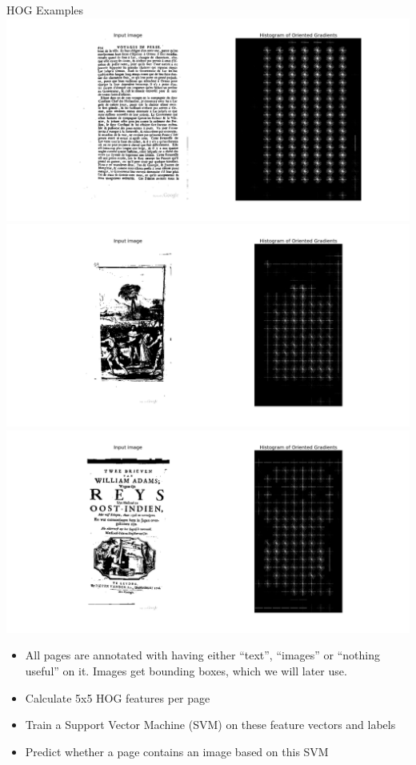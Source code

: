 \begin{frame}[allowframebreaks]{HOG Examples}
	\includegraphics[trim=200px 0px 100px 0px, clip=true, width=.8\paperwidth]{resources/text1}\\
\framebreak
	\includegraphics[trim=200px 0px 100px 0px, clip=true, width=.8\paperwidth]{resources/image1}\\
\framebreak
	\includegraphics[trim=200px 0px 100px 0px, clip=true, width=.8\paperwidth]{resources/text_and_image1}
\end{frame}

{
	\begin{itemize}
		\item All pages are annotated with having either ``text'', ``images'' or
		``nothing useful'' on it. Images get bounding boxes, which we will later
		use.
		\item Calculate 5x5 HOG features per page
		\item Train a Support Vector Machine (SVM) on these feature vectors and
		labels
		\item Predict whether a page contains an image based on this SVM
	\end{itemize}
}

